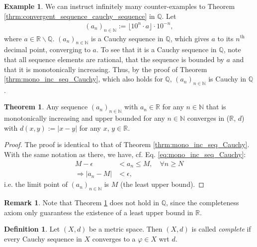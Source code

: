 \documentclass[12pt, a4paper]{article}
\numberwithin{equation}{section}
\theoremstyle{definition}
\theoremstyle{definition}
\newtheorem{defn}[thm]{Definition} %
\newtheorem{exmp}[thm]{Example} %
\newtheorem{remark}[thm]{Remark} %
\newtheorem{theorem}[thm]{Theorem}
\newcommand{\abs}[1]{\left\vert #1 \right\vert}
\newcommand{\floor}[1]{\lfloor #1 \rfloor}
\begin{document}
	\begin{exmp}
		We can instruct infinitely many counter-examples to Theorem \ref{thrm:convergent_sequence_cauchy_sequence} in $\mathbb Q$. Let 
		\begin{align}
			\left(a_n\right)_{n\in\mathbb N} := \floor{10^{n} \cdot a}\cdot 10^{-n}, 
		\end{align}
		where $a\in \mathbb R\backslash \mathbb Q$. $(a_n)_{n\in\mathbb N}$ is a Cauchy sequence in $\mathbb Q$, which gives $a$ to its $n^{\text{th}}$ decimal point, converging to $a$. To see that it is a Cauchy sequence in $\mathbb Q$, note that all sequence elements are rational, that the sequence is bounded by $a$ and that it is monotonically increasing. Thus, by the proof of Theorem \ref{thrm:mono_inc_seq_Cauchy}, which also holds for $\mathbb Q$, $\left(a_n\right)_{n\in\mathbb N}$ is Cauchy in $\mathbb Q$.
	\end{exmp}

	\begin{theorem}\label{thrm:mono_inc_seq_converges}
		Any sequence $(a_n)_{n\in\mathbb N}$ with $a_n\in \mathbb R$ for any $n\in \mathbb N$ that is monotonically increasing and upper bounded for any $n\in\mathbb N$ converges in ($\mathbb R$, $d$) with $d(x, y):= \abs{x - y}$ for any $x$, $y\in \mathbb R$.
	\end{theorem}

	\begin{proof}
		The proof is identical to that of Theorem \ref{thrm:mono_inc_seq_Cauchy}. With the same notation as there, we have, cf. Eq. \eqref{eq:mono_inc_seq_Cauchy}:
		\begin{align}
			M - \epsilon &< a_n \leq M, \quad \forall n\geq N
			\\ \Rightarrow \abs{a_n - M} &< \epsilon,
		\end{align}
		i.e. the limit point of $(a_n)_{n\in\mathbb N}$ is $M$ (the least upper bound).
	\end{proof}

	\begin{remark}
		Note that Theorem \ref{thrm:mono_inc_seq_converges} does not hold in $\mathbb Q$, since the completeness axiom only guarantess the existence of a least upper bound in $\mathbb R$.
	\end{remark}

	\begin{defn}
		Let $(X, d)$ be a metric space. Then $(X, d)$ is called \textit{complete} if every Cauchy sequence in $X$ converges to a $\varphi\in X$ wrt $d$.
	\end{defn}
	
\end{document}
